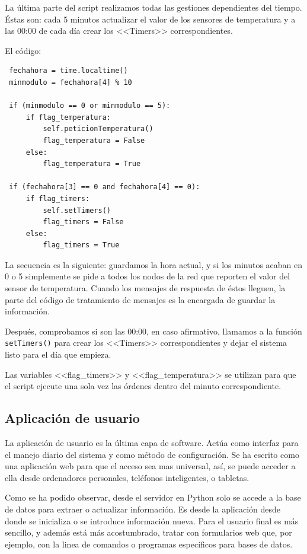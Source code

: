     
 La última parte del script realizamos todas las gestiones dependientes del tiempo. Éstas son: cada 5 minutos actualizar el valor de los sensores de temperatura y  a las 00:00 de cada día crear los <<Timers>> correspondientes.
 
 El código:
 \begin{lstlisting}
 fechahora = time.localtime()
 minmodulo = fechahora[4] % 10
 
 if (minmodulo == 0 or minmodulo == 5):
     if flag_temperatura:
         self.peticionTemperatura()
         flag_temperatura = False
     else:
         flag_temperatura = True
 
 if (fechahora[3] == 0 and fechahora[4] == 0):
     if flag_timers:
         self.setTimers()
         flag_timers = False
     else:
         flag_timers = True
 \end{lstlisting}
    
  La secuencia es la siguiente: guardamos la hora actual, y si los minutos acaban en 0 o 5 simplemente se pide a todos los nodos de la red que reporten el valor del sensor de temperatura. Cuando los mensajes de respuesta de éstos lleguen, la parte del código de tratamiento de mensajes es la encargada de guardar la información.
  
  Después, comprobamos si son las 00:00, en caso afirmativo, llamamos a la función \lstinline|setTimers()| para crear los <<Timers>> correspondientes y dejar el sistema listo para el día que empieza.
  
  Las variables <<flag\_timers>> y <<flag\_temperatura>> se utilizan para que el script ejecute una sola vez las órdenes dentro del minuto correspondiente.
  
  
  \subsection{Aplicación de usuario}
  
  La aplicación de usuario es la última capa de software. Actúa como interfaz para el manejo diario del sistema y como método de configuración. Se ha escrito como una aplicación web para que el acceso sea mas universal, así, se puede acceder a ella desde ordenadores personales, teléfonos inteligentes, o tabletas.
  
  Como se ha podido observar, desde el servidor en Python solo se accede a la base de datos para extraer o actualizar información. Es desde la aplicación desde donde se inicializa o se introduce información nueva. Para el usuario final es más sencillo, y además está más acostumbrado, tratar con formularios web que, por ejemplo,  con la linea de comandos o programas específicos para bases de datos.
  
